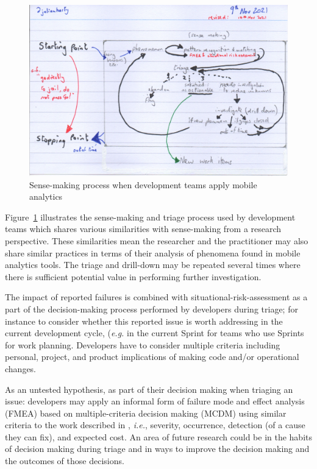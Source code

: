 \begin{figure}
    \centering
    \includegraphics[width=15cm]{images/rough-sketches/practical-sense-making-process-10-nov-2021.jpeg}
    \caption{Sense-making process when development teams apply mobile analytics}
    \label{fig:practical-sense-making-process-when-dev-teams-apply-mobile-analytics}
\end{figure}


Figure~\ref{fig:practical-sense-making-process-when-dev-teams-apply-mobile-analytics} illustrates the sense-making and triage process used by development teams which shares various similarities with sense-making from a research perspective. These similarities mean the researcher and the practitioner may also share similar practices in terms of their analysis of phenomena found in mobile analytics tools. The triage and drill-down may be repeated several times where there is sufficient potential value in performing further investigation. 

The impact of reported failures is combined with situational-risk-assessment as a part of the decision-making process performed by developers during triage; for instance to consider whether this reported issue is worth addressing in the current development cycle, (\textit{e.g.} in the current Sprint for teams who use Sprints for work planning. Developers have to consider multiple criteria including personal, project, and product implications of making code and/or operational changes.

As an untested hypothesis, as part of their decision making when triaging an issue: developers may apply an informal form of failure mode and effect analysis (FMEA) based on multiple-criteria decision making (MCDM) using similar criteria to the work described in \citealt{lo2018_novel_multi_criteria_decision_making_based_FMEA_model_for_risk_assessment}, \textit{i.e.}, severity, occurrence, detection (of a cause they can fix), and expected cost. An area of future research could be in the habits of decision making during triage and in ways to improve the decision making and the outcomes of those decisions.

